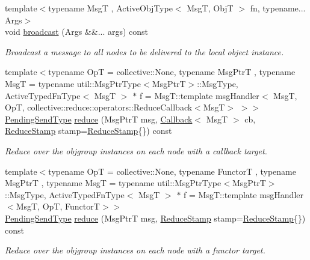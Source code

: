 \begin{DoxyCompactItemize}
{\footnotesize template$<$typename MsgT , Active\+Obj\+Type$<$ Msg\+T, Obj\+T $>$ fn, typename... Args$>$ }\\void \hyperlink{structvt_1_1objgroup_1_1proxy_1_1_proxy_ad4f1ddeb5b09f01643b17a93bbbe82e9}{broadcast} (Args \&\&... args) const
\begin{DoxyCompactList}\small\item\em Broadcast a message to all nodes to be delivered to the local object instance. \end{DoxyCompactList}\item 
{\footnotesize template$<$typename OpT  = collective\+::\+None, typename Msg\+PtrT , typename MsgT  = typename util\+::\+Msg\+Ptr\+Type$<$\+Msg\+Ptr\+T$>$\+::\+Msg\+Type, Active\+Typed\+Fn\+Type$<$ Msg\+T $>$ $\ast$ f = Msg\+T\+::template msg\+Handler$<$      Msg\+T, Op\+T, collective\+::reduce\+::operators\+::\+Reduce\+Callback$<$\+Msg\+T$>$    $>$$>$ }\\\hyperlink{structvt_1_1objgroup_1_1proxy_1_1_proxy_a1bdf8713203531d306702a024872bb08}{Pending\+Send\+Type} \hyperlink{structvt_1_1objgroup_1_1proxy_1_1_proxy_a61273d407174fb496b4aed10ec6650bd}{reduce} (Msg\+PtrT msg, \hyperlink{namespacevt_a36db99df4c973d48b1118a293fff533f}{Callback}$<$ MsgT $>$ cb, \hyperlink{structvt_1_1objgroup_1_1proxy_1_1_proxy_a337be4c20cf11ff6477c7a66208cc909}{Reduce\+Stamp} stamp=\hyperlink{structvt_1_1objgroup_1_1proxy_1_1_proxy_a337be4c20cf11ff6477c7a66208cc909}{Reduce\+Stamp}\{\}) const
\begin{DoxyCompactList}\small\item\em Reduce over the objgroup instances on each node with a callback target. \end{DoxyCompactList}\item 
{\footnotesize template$<$typename OpT  = collective\+::\+None, typename FunctorT , typename Msg\+PtrT , typename MsgT  = typename util\+::\+Msg\+Ptr\+Type$<$\+Msg\+Ptr\+T$>$\+::\+Msg\+Type, Active\+Typed\+Fn\+Type$<$ Msg\+T $>$ $\ast$ f = Msg\+T\+::template msg\+Handler$<$\+Msg\+T, Op\+T, Functor\+T$>$$>$ }\\\hyperlink{structvt_1_1objgroup_1_1proxy_1_1_proxy_a1bdf8713203531d306702a024872bb08}{Pending\+Send\+Type} \hyperlink{structvt_1_1objgroup_1_1proxy_1_1_proxy_a55fdba093739d439d22076815e1ad424}{reduce} (Msg\+PtrT msg, \hyperlink{structvt_1_1objgroup_1_1proxy_1_1_proxy_a337be4c20cf11ff6477c7a66208cc909}{Reduce\+Stamp} stamp=\hyperlink{structvt_1_1objgroup_1_1proxy_1_1_proxy_a337be4c20cf11ff6477c7a66208cc909}{Reduce\+Stamp}\{\}) const
\begin{DoxyCompactList}\small\item\em Reduce over the objgroup instances on each node with a functor target. \end{DoxyCompactList}\item 

\end{DoxyCompactItemize}
